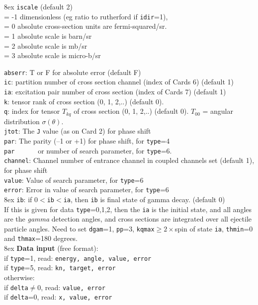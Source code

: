 \documentclass[11pt]{article}
\begin{document}
\hangindent 8ex
{\tt iscale} (default 2)
\\ = -1 dimensionless (eg ratio to rutherford if {\tt idir}=1),
\\ = 0 absolute cross-section units are fermi-squared/sr.
\\ = 1 absolute scale is barn/sr
\\ = 2 absolute scale is mb/sr
\\ = 3 absolute scale is micro-b/sr


{\tt abserr}: T or F for absolute error (default F)\\
{\tt ic}: partition number of cross section channel (index of Cards 6)  (default 1)\\
{\tt ia}: excitation pair number of cross section (index of Cards 7)  (default 1)\\
{\tt k}: tensor rank of cross section (0, 1, 2,..) (default 0). \\
{\tt q}: index for tensor $T_{kq}$ of cross section (0, 1, 2,..) (default 0).
    $T_{00}$ = angular distribution $\sigma(\theta)$.\\
{\tt jtot}: The {\tt J} value (as on Card 2) for phase shift\\
{\tt par}: The parity (--1 or +1) for phase shift, for {\tt type}=4\\
{\tt par}~~~~~~ or number of search parameter, for {\tt type}=6.\\
{\tt channel}: Channel number of entrance channel in coupled channels set (default 1),
for phase shift\\
{\tt value}: Value of search parameter, for {\tt type}=6\\
{\tt error}: Error in value of search parameter, for {\tt type}=6\\

\hangindent 8ex
{\tt ib}: if 0$<${\tt ib}$<${\tt ia}, then {\tt ib} is final state of gamma decay. (default 0)\\
     If this is given for data {\tt type}=0,1,2, then the {\tt ia} is the initial state, and 
     all angles are the {\em  gamma} detection angles, and cross sections are integrated over all ejectile particle angles.
     Need to set {\tt dgam}=1, {\tt pp}=3, {\tt kqmax}$\geq 2\times$spin of state {\tt ia}, 
        {\tt thmin}=0 and {\tt thmax}=180 degrees.\\
       
       
\hangindent 8ex
{\bf Data input} (free format):
\\ if {\tt type}=1, read:  {\tt energy, angle, value, error}
\\ if {\tt type}=5, read:  {\tt kn, target, error}
\\ otherwise:
\\ if {\tt delta}$\ne$0, read:  {\tt value, error}
\\ if {\tt delta}=0, read:  {\tt x, value, error}
\end{document}
